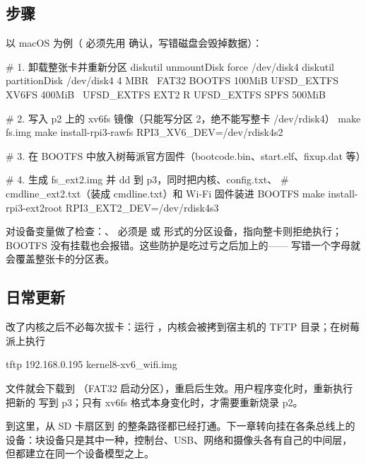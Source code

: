 \subsection{步骤}

以 macOS 为例（ 必须先用  确认，写错磁盘会毁掉数据）：

\begin{shcode}
# 1. 卸载整张卡并重新分区
diskutil unmountDisk force /dev/disk4
diskutil partitionDisk /dev/disk4 4 MBR \
  FAT32 BOOTFS 100MiB  UFSD_EXTFS XV6FS 400MiB \
  UFSD_EXTFS EXT2 R    UFSD_EXTFS SPFS 500MiB

# 2. 写入 p2 上的 xv6fs 镜像（只能写分区 2，绝不能写整卡 /dev/rdisk4）
make fs.img
make install-rpi3-rawfs RPI3_XV6_DEV=/dev/rdisk4s2

# 3. 在 BOOTFS 中放入树莓派官方固件（bootcode.bin、start.elf、fixup.dat 等）

# 4. 生成 fs_ext2.img 并 dd 到 p3，同时把内核、config.txt、
#    cmdline_ext2.txt（装成 cmdline.txt）和 Wi-Fi 固件装进 BOOTFS
make install-rpi3-ext2root RPI3_EXT2_DEV=/dev/rdisk4s3
\end{shcode}

 对设备变量做了检查：、 必须是  或  形式的分区设备，指向整卡则拒绝执行；BOOTFS 没有挂载也会报错。这些防护是吃过亏之后加上的—— 写错一个字母就会覆盖整张卡的分区表。

\subsection{日常更新}

改了内核之后不必每次拔卡：运行 ，内核会被拷到宿主机的 TFTP 目录；在树莓派上执行

\begin{shcode}
tftp 192.168.0.195 kernel8-xv6_wifi.img
\end{shcode}

文件就会下载到 （FAT32 启动分区），重启后生效。用户程序变化时，重新执行  把新的  写到 p3；只有 xv6fs 格式本身变化时，才需要重新烧录 p2。

到这里，从 SD 卡扇区到 \code{open("/bin/sh")} 的整条路径都已经打通。下一章转向挂在各条总线上的设备：块设备只是其中一种，控制台、USB、网络和摄像头各有自己的中间层，但都建立在同一个设备模型之上。
